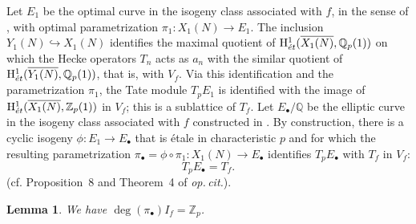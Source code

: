 \documentclass[a4paper,10pt]{amsart}
\numberwithin{equation}{section}
\numberwithin{equation}{section}
\theoremstyle{plain}
\theoremstyle{definition}
\theoremstyle{definition}
\theoremstyle{plain}
\theoremstyle{plain}
\newtheorem{lemma}[thm]{Lemma}
\theoremstyle{plain}
\theoremstyle{plain}
\newcommand{\Z}{\mathbb{Z}}
\newcommand{\Q}{\mathbb{Q}}
\newcommand{\Zp}{\mathbb{Z}_{p}}
\newcommand{\et}{\rm \acute{e}t}
\newcommand{\rH}{\mathrm{H}}
\begin{document}
Let $E_1$ be the optimal curve in the isogeny class associated with $f$, in the sense of \cite{stevens-invmath}, with optimal parametrization $\pi_1:X_1(N)\rightarrow E_1$. 
The inclusion $Y_1(N)\hookrightarrow X_1(N)$ identifies the maximal quotient of $\rH^1_{\et}(\overline{X_1(N)},\Q_p(1))$ on which the Hecke operators $T_n$ acts as $a_n$
with the similar quotient of $\rH^1_{\et}(\overline{Y_1(N)},\Q_p(1))$, that is, with $V_f$. Via this identification and the parametrization $\pi_1$, the Tate module $T_pE_1$ is identified with the image of $\rH^1_{\et}(\overline{X_1(N)},\Z_p(1))$ in $V_f$; this is a sublattice of $T_f$. 
Let $E_\bullet/\Q$ be the elliptic curve in the isogeny class associated with $f$ constructed in \cite{wuthrich-int}. By construction, there is a cyclic isogeny
$\phi:E_1\rightarrow E_\bullet$ that is \'etale in characteristic $p$ and for which the resulting parametrization $\pi_\bullet = \phi\circ\pi_1:X_1(N)\rightarrow E_\bullet$ 
identifies $T_pE_\bullet$ with $T_f$ in $V_f$:
\[
T_pE_\bullet = T_f.
\] 
(cf. Proposition~8 and Theorem~4 of  \emph{op.\,cit.}).










\begin{lemma}\label{lem:cong-deg}
We have $\deg(\pi_\bullet)I_f  = \Zp$.
\end{lemma}
\end{document}
